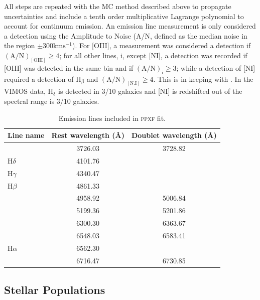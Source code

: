 		All steps are repeated with the MC method described above to propagate uncertainties and include a tenth order multiplicative Lagrange polynomial to account for continuum emission. An emission line measurement is only considered a detection using the Amplitude to Noise (A/N, defined as the median noise in the region $\pm 300 \mathrm{km s^{-1}}$). For [OIII], a measurement was considered a detection if $(\mathrm{A/N})_\mathrm{[OIII]} \ge 4$; for all other lines, i, except [NI], a detection was recorded if [OIII] was detected in the same bin and if $(\mathrm{A/N})_\mathrm{i} \ge 3$; while a detection of [NI] required a detection of H$_\beta$ and $(\mathrm{A/N})_\mathrm{[N.I]} \ge 4$. This is in keeping with \citet{Sarzi2005}. In the VIMOS data, H$_\mathrm{\delta}$ is detected in 3/10 galaxies and [NI] is redshifted out of the spectral range is 3/10 galaxies.




	 	\begin{table}
	 		\centering
	 	\begin{threeparttable}
	 		\caption{Emission lines included in \textsc{ppxf} fit.}
	 		\label{tab:EmissionLine}
	 		\begin{tabular}{l c c}
	 		\hline
	 		\hline
	 		Line name 		& Rest wavelength (\AA) & Doublet wavelength (\AA) \\
	 		\hline
	 		[\ion{O}{ii}] 	& 3726.03 & 3728.82 \\
	 		H$\delta$ 		& 4101.76 & \\
	 		H$\gamma$ 		& 4340.47 & \\
	 		H$\beta$ 		& 4861.33 & \\
	 		[\ion{O}{iii}] 	& 4958.92 & 5006.84 \\
	 		[\ion{N}{i}] 	& 5199.36 & 5201.86 \\
	 		[\ion{O}{i}] 	& 6300.30 & 6363.67 \\
	 		[\ion{N}{ii}] 	& 6548.03 & 6583.41 \\
	 		H$\alpha$ 		& 6562.30 &\\
	 		[\ion{S}{ii}] 	& 6716.47 & 6730.85 \\
	 		\hline
	 		\hline
	 		\end{tabular}
	 	\end{threeparttable}
	 	\end{table}





	 \subsection{Stellar Populations}





